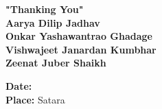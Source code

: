 \documentclass[12pt,a4paper]{report}
\begin{document}
\begin{flushright}
{\normalsize
\textbf{"Thanking You"\\[6pt]
Aarya Dilip Jadhav\\
Onkar Yashawantrao Ghadage\\
Vishwajeet Janardan Kumbhar\\
Zeenat Juber Shaikh\\
}}
\end{flushright}

\vspace{40pt}

\begin{flushleft}
{\normalsize
\textbf{Date:}\\
\textbf{Place:} Satara
}
\end{flushleft}

\newpage


\end{document}
